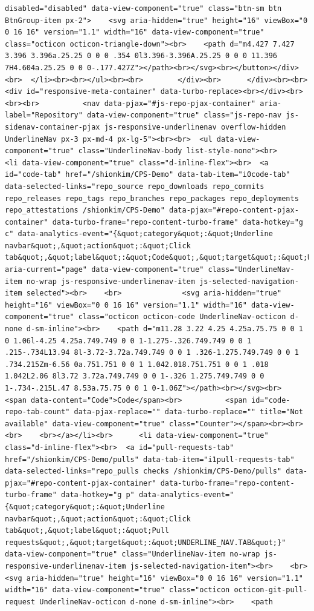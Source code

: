 \documentclass[
  letterpaper,
]{book}
\begin{document}
\begin{verbatim}
disabled="disabled" data-view-component="true" class="btn-sm btn BtnGroup-item px-2">    <svg aria-hidden="true" height="16" viewBox="0 0 16 16" version="1.1" width="16" data-view-component="true" class="octicon octicon-triangle-down"><br>    <path d="m4.427 7.427 3.396 3.396a.25.25 0 0 0 .354 0l3.396-3.396A.25.25 0 0 0 11.396 7H4.604a.25.25 0 0 0-.177.427Z"></path><br></svg><br></button></div><br>  </li><br><br></ul><br><br>        </div><br>      </div><br><br>        <div id="responsive-meta-container" data-turbo-replace><br></div><br><br><br>          <nav data-pjax="#js-repo-pjax-container" aria-label="Repository" data-view-component="true" class="js-repo-nav js-sidenav-container-pjax js-responsive-underlinenav overflow-hidden UnderlineNav px-3 px-md-4 px-lg-5"><br><br>  <ul data-view-component="true" class="UnderlineNav-body list-style-none"><br>      <li data-view-component="true" class="d-inline-flex"><br>  <a id="code-tab" href="/shionkim/CPS-Demo" data-tab-item="i0code-tab" data-selected-links="repo_source repo_downloads repo_commits repo_releases repo_tags repo_branches repo_packages repo_deployments repo_attestations /shionkim/CPS-Demo" data-pjax="#repo-content-pjax-container" data-turbo-frame="repo-content-turbo-frame" data-hotkey="g c" data-analytics-event="{&quot;category&quot;:&quot;Underline navbar&quot;,&quot;action&quot;:&quot;Click tab&quot;,&quot;label&quot;:&quot;Code&quot;,&quot;target&quot;:&quot;UNDERLINE_NAV.TAB&quot;}" aria-current="page" data-view-component="true" class="UnderlineNav-item no-wrap js-responsive-underlinenav-item js-selected-navigation-item selected"><br>    <br>              <svg aria-hidden="true" height="16" viewBox="0 0 16 16" version="1.1" width="16" data-view-component="true" class="octicon octicon-code UnderlineNav-octicon d-none d-sm-inline"><br>    <path d="m11.28 3.22 4.25 4.25a.75.75 0 0 1 0 1.06l-4.25 4.25a.749.749 0 0 1-1.275-.326.749.749 0 0 1 .215-.734L13.94 8l-3.72-3.72a.749.749 0 0 1 .326-1.275.749.749 0 0 1 .734.215Zm-6.56 0a.751.751 0 0 1 1.042.018.751.751 0 0 1 .018 1.042L2.06 8l3.72 3.72a.749.749 0 0 1-.326 1.275.749.749 0 0 1-.734-.215L.47 8.53a.75.75 0 0 1 0-1.06Z"></path><br></svg><br>        <span data-content="Code">Code</span><br>          <span id="code-repo-tab-count" data-pjax-replace="" data-turbo-replace="" title="Not available" data-view-component="true" class="Counter"></span><br><br><br>    <br></a></li><br>      <li data-view-component="true" class="d-inline-flex"><br>  <a id="pull-requests-tab" href="/shionkim/CPS-Demo/pulls" data-tab-item="i1pull-requests-tab" data-selected-links="repo_pulls checks /shionkim/CPS-Demo/pulls" data-pjax="#repo-content-pjax-container" data-turbo-frame="repo-content-turbo-frame" data-hotkey="g p" data-analytics-event="{&quot;category&quot;:&quot;Underline navbar&quot;,&quot;action&quot;:&quot;Click tab&quot;,&quot;label&quot;:&quot;Pull requests&quot;,&quot;target&quot;:&quot;UNDERLINE_NAV.TAB&quot;}" data-view-component="true" class="UnderlineNav-item no-wrap js-responsive-underlinenav-item js-selected-navigation-item"><br>    <br>              <svg aria-hidden="true" height="16" viewBox="0 0 16 16" version="1.1" width="16" data-view-component="true" class="octicon octicon-git-pull-request UnderlineNav-octicon d-none d-sm-inline"><br>    <path 
\end{verbatim}
\end{document}
